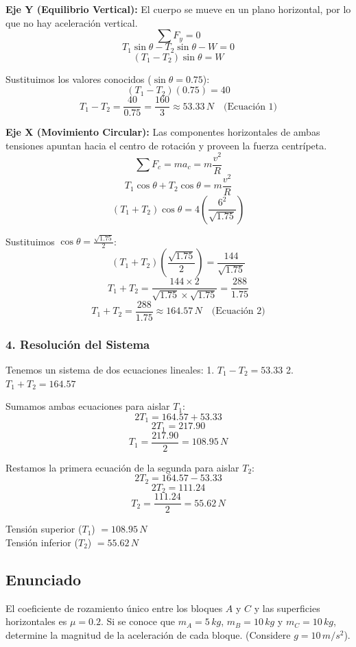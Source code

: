 \documentclass[12pt, a4paper]{article}
\begin{document}
\textbf{Eje Y (Equilibrio Vertical):}
El cuerpo se mueve en un plano horizontal, por lo que no hay aceleración vertical.
$$ \sum F_y = 0 $$
$$ T_1 \sin\theta - T_2 \sin\theta - W = 0 $$
$$ (T_1 - T_2) \sin\theta = W $$

Sustituimos los valores conocidos ($\sin\theta = 0.75$):
$$ (T_1 - T_2) (0.75) = 40 $$
$$ T_1 - T_2 = \frac{40}{0.75} = \frac{160}{3} \approx 53.33 \, \si{N} \quad \text{(Ecuación 1)} $$

\textbf{Eje X (Movimiento Circular):}
Las componentes horizontales de ambas tensiones apuntan hacia el centro de rotación y proveen la fuerza centrípeta.
$$ \sum F_c = m a_c = m \frac{v^2}{R} $$
$$ T_1 \cos\theta + T_2 \cos\theta = m \frac{v^2}{R} $$
$$ (T_1 + T_2) \cos\theta = 4 \left( \frac{6^2}{\sqrt{1.75}} \right) $$

Sustituimos $\cos\theta = \frac{\sqrt{1.75}}{2}$:
$$ (T_1 + T_2) \left( \frac{\sqrt{1.75}}{2} \right) = \frac{144}{\sqrt{1.75}} $$
$$ T_1 + T_2 = \frac{144 \times 2}{\sqrt{1.75} \times \sqrt{1.75}} = \frac{288}{1.75} $$
$$ T_1 + T_2 = \frac{288}{1.75} \approx 164.57 \, \si{N} \quad \text{(Ecuación 2)} $$

\subsubsection*{4. Resolución del Sistema}
Tenemos un sistema de dos ecuaciones lineales:
1. $T_1 - T_2 = 53.33$
2. $T_1 + T_2 = 164.57$

Sumamos ambas ecuaciones para aislar $T_1$:
$$ 2 T_1 = 164.57 + 53.33 $$
$$ 2 T_1 = 217.90 $$
$$ T_1 = \frac{217.90}{2} = 108.95 \, \si{N} $$

Restamos la primera ecuación de la segunda para aislar $T_2$:
$$ 2 T_2 = 164.57 - 53.33 $$
$$ 2 T_2 = 111.24 $$
$$ T_2 = \frac{111.24}{2} = 55.62 \, \si{N} $$

\begin{tcolorbox}[colback=green!5!white, colframe=green!50!black, title=Respuesta Final]
\centering
Tensión superior ($T_1$) $= 108.95 \, \si{N}$ \\
Tensión inferior ($T_2$) $= 55.62 \, \si{N}$
\end{tcolorbox}

\newpage

\subsection*{Enunciado}
El coeficiente de rozamiento único entre los bloques $A$ y $C$ y las superficies horizontales es $\mu = 0.2$. Si se conoce que $m_A = 5\,\si{kg}$, $m_B = 10\,\si{kg}$ y $m_C = 10\,\si{kg}$, determine la magnitud de la aceleración de cada bloque. (Considere $g = 10\,\si{m/s^2}$).
\end{document}
